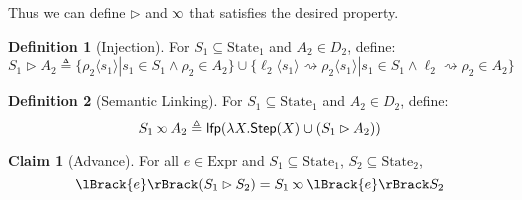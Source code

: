 \documentclass{article}
\theoremstyle{definition}
\newtheorem{definition}{Definition}[section]
\newtheorem{clm}{Claim}[section]
\newcommand*{\Expr}{\text{Expr}}
\newcommand*{\State}{\text{State}}
\newcommand*{\lfp}{\mathsf{lfp}}
\newcommand*{\Step}{\mathsf{Step}}
\newcommand*{\semarrow}{\rightsquigarrow}
\newcommand*{\semlink}{\mathbin{\rotatebox[origin=c]{180}{$\propto$}}}
\newcommand*{\sembracket}[1]{\lBrack{#1}\rBrack}
\newcommand*{\inject}[2]{{#2}\langle{#1}\rangle}
\begin{document}
Thus we can define $\rhd$ and $\semlink$ that satisfies the desired property.
\begin{definition}[Injection]
  For $S_1\subseteq\State_1$ and $A_2\in D_2$, define:
  \[
    S_1\rhd A_2\triangleq\{\inject{s_1}{\rho_2}|s_1\in S_1\wedge\rho_2\in A_2\}\cup\{\inject{s_1}{\ell_2}\semarrow\inject{s_1}{\rho_2}|s_1\in S_1\wedge\ell_2\semarrow\rho_2\in A_2\}
  \]
\end{definition}
\begin{definition}[Semantic Linking]
  For $S_1\subseteq\State_1$ and $A_2\in D_2$, define:
  \[
    S_1\semlink A_2\triangleq\lfp(\lambda X.\Step(X)\cup(S_1\rhd A_2))
  \]
\end{definition}
\begin{clm}[Advance]
  For all $e\in\Expr$ and $S_1\subseteq\State_1$, $S_2\subseteq\State_2$,
  \[
    \sembracket{e}(S_1\rhd S_2)=S_1\semlink\sembracket{e}S_2
  \]
\end{clm}
\end{document}
